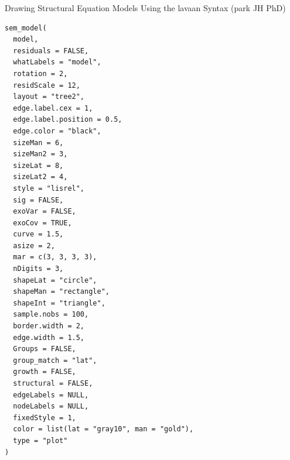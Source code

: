 \documentclass[a4paper]{book}
\begin{document}
%
\begin{Description}
Drawing Structural Equation Models Using the lavaan Syntax (park JH PhD)
\end{Description}
%
\begin{Usage}
\begin{verbatim}
sem_model(
  model,
  residuals = FALSE,
  whatLabels = "model",
  rotation = 2,
  residScale = 12,
  layout = "tree2",
  edge.label.cex = 1,
  edge.label.position = 0.5,
  edge.color = "black",
  sizeMan = 6,
  sizeMan2 = 3,
  sizeLat = 8,
  sizeLat2 = 4,
  style = "lisrel",
  sig = FALSE,
  exoVar = FALSE,
  exoCov = TRUE,
  curve = 1.5,
  asize = 2,
  mar = c(3, 3, 3, 3),
  nDigits = 3,
  shapeLat = "circle",
  shapeMan = "rectangle",
  shapeInt = "triangle",
  sample.nobs = 100,
  border.width = 2,
  edge.width = 1.5,
  Groups = FALSE,
  group_match = "lat",
  growth = FALSE,
  structural = FALSE,
  edgeLabels = NULL,
  nodeLabels = NULL,
  fixedStyle = 1,
  color = list(lat = "gray10", man = "gold"),
  type = "plot"
)
\end{verbatim}
\end{Usage}
%
\end{document}
